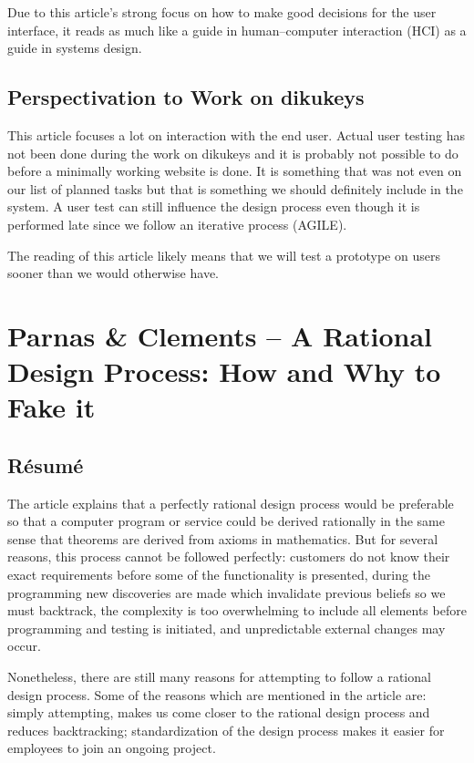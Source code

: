 \documentclass[11pt,a4paper]{report}
\begin{document}
Due to this article's strong focus on how to make good decisions for the user interface, it reads as much like a guide in human–computer interaction (HCI) as a guide in systems design.
\subsection{Perspectivation to Work on dikukeys}
This article focuses a lot on interaction with the end user. Actual user testing has not been done during the work on dikukeys and it is probably not possible to do before a minimally working website is done. It is something that was not even on our list of planned tasks but that is something we should definitely include in the system. A user test can still influence the design process even though it is performed late since we follow an iterative process (AGILE).

The reading of this article likely means that we will test a prototype on users sooner than we would otherwise have.
\newpage
\section{Parnas \& Clements -- A Rational Design Process: How and Why to
Fake it}
\subsection{Résumé}
The article explains that a perfectly rational design process would be preferable so that a computer program or service could be derived rationally in the same sense that theorems are derived from axioms in mathematics. But for several reasons, this process cannot be followed perfectly: customers do not know their exact requirements before some of the functionality is presented, during the programming new discoveries are made which invalidate previous beliefs so we must backtrack, the complexity is too overwhelming to include all elements before programming and testing is initiated, and unpredictable external changes may occur.

Nonetheless, there are still many reasons for attempting to follow a rational design process. Some of the reasons which are mentioned in the article are: simply attempting, makes us come closer to the rational design process and reduces backtracking; standardization of the design process makes it easier for employees to join an ongoing project.
\end{document}
